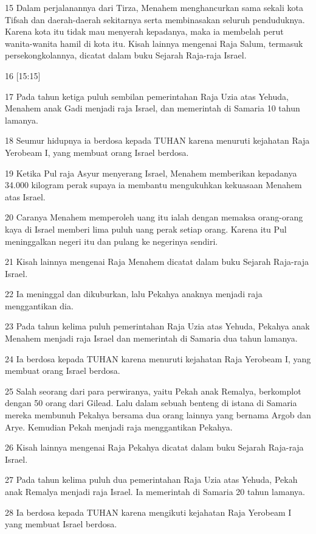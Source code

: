 \par 15 Dalam perjalanannya dari Tirza, Menahem menghancurkan sama sekali kota Tifsah dan daerah-daerah sekitarnya serta membinasakan seluruh penduduknya. Karena kota itu tidak mau menyerah kepadanya, maka ia membelah perut wanita-wanita hamil di kota itu. Kisah lainnya mengenai Raja Salum, termasuk persekongkolannya, dicatat dalam buku Sejarah Raja-raja Israel.
\par 16 [15:15]
\par 17 Pada tahun ketiga puluh sembilan pemerintahan Raja Uzia atas Yehuda, Menahem anak Gadi menjadi raja Israel, dan memerintah di Samaria 10 tahun lamanya.
\par 18 Seumur hidupnya ia berdosa kepada TUHAN karena menuruti kejahatan Raja Yerobeam I, yang membuat orang Israel berdosa.
\par 19 Ketika Pul raja Asyur menyerang Israel, Menahem memberikan kepadanya 34.000 kilogram perak supaya ia membantu mengukuhkan kekuasaan Menahem atas Israel.
\par 20 Caranya Menahem memperoleh uang itu ialah dengan memaksa orang-orang kaya di Israel memberi lima puluh uang perak setiap orang. Karena itu Pul meninggalkan negeri itu dan pulang ke negerinya sendiri.
\par 21 Kisah lainnya mengenai Raja Menahem dicatat dalam buku Sejarah Raja-raja Israel.
\par 22 Ia meninggal dan dikuburkan, lalu Pekahya anaknya menjadi raja menggantikan dia.
\par 23 Pada tahun kelima puluh pemerintahan Raja Uzia atas Yehuda, Pekahya anak Menahem menjadi raja Israel dan memerintah di Samaria dua tahun lamanya.
\par 24 Ia berdosa kepada TUHAN karena menuruti kejahatan Raja Yerobeam I, yang membuat orang Israel berdosa.
\par 25 Salah seorang dari para perwiranya, yaitu Pekah anak Remalya, berkomplot dengan 50 orang dari Gilead. Lalu dalam sebuah benteng di istana di Samaria mereka membunuh Pekahya bersama dua orang lainnya yang bernama Argob dan Arye. Kemudian Pekah menjadi raja menggantikan Pekahya.
\par 26 Kisah lainnya mengenai Raja Pekahya dicatat dalam buku Sejarah Raja-raja Israel.
\par 27 Pada tahun kelima puluh dua pemerintahan Raja Uzia atas Yehuda, Pekah anak Remalya menjadi raja Israel. Ia memerintah di Samaria 20 tahun lamanya.
\par 28 Ia berdosa kepada TUHAN karena mengikuti kejahatan Raja Yerobeam I yang membuat Israel berdosa.
